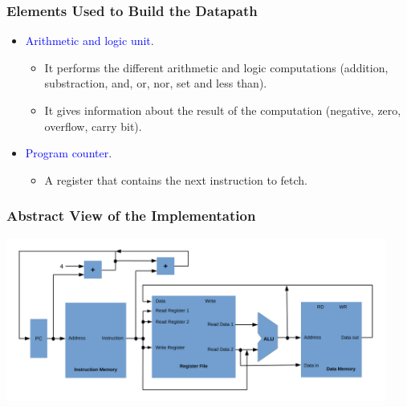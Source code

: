 \documentclass{beamer}
\begin{document}
\begin{frame}%
\frametitle{Elements Used to Build the Datapath}

\begin{itemize}

\item \textcolor{blue}{Arithmetic and logic unit}.
  \begin{itemize}
  \item It performs the different arithmetic and logic computations (addition, substraction, and, or, nor, set and less than).
  \item It gives information about the result of the computation (negative, zero, overflow, carry bit).
  \end{itemize}

\vspace{0.5cm}

\item \textcolor{blue}{Program counter}.
  \begin{itemize}
  \item A register that contains the next instruction to fetch.
  \end{itemize}

\end{itemize}

\end{frame}

\begin{frame}%
\frametitle{Abstract View of the Implementation}

\begin{center}
\hspace*{-1cm}\includegraphics[width=12.5cm]{abstract_view.pdf}
\end{center}

\end{frame}

\end{document}
